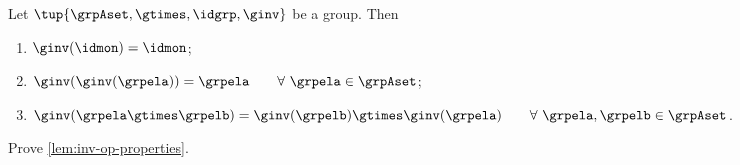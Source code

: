 \begin{lemma}\label{lem:inv-op-properties}
Let $\tup{\grpAset, \gtimes, \idgrp, \ginv}$ be a group. Then
\begin{enumerate}
\item\label{eq:group-neutral-invariant} $\ginv(\idmon) = \idmon$;
\item\label{eq:group-inverse-inverse}  $ \ginv(\ginv(\grpela)) = \grpela \quad \quad \forall \  \grpela \in \grpAset$;
\item\label{eq:group-inverse-of-composition} $\ginv(\grpela \gtimes \grpelb ) = \ginv(\grpelb) \gtimes \ginv(\grpela) \quad \quad \forall \ \grpela, \grpelb \in \grpAset$.
\end{enumerate}
\end{lemma}
\begin{gradedexercise}
Prove \cref{lem:inv-op-properties}.
\end{gradedexercise}
